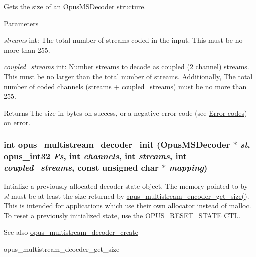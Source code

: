 Gets the size of an {\ttfamily OpusMSDecoder} structure. 
\begin{DoxyParams}{Parameters}
\item[{\em streams}]{\ttfamily int}: The total number of streams coded in the input. This must be no more than 255. \item[{\em coupled\_\-streams}]{\ttfamily int}: Number streams to decode as coupled (2 channel) streams. This must be no larger than the total number of streams. Additionally, The total number of coded channels ({\ttfamily streams + coupled\_\-streams}) must be no more than 255. \end{DoxyParams}
\begin{DoxyReturn}{Returns}
The size in bytes on success, or a negative error code (see \hyperlink{group__opus__errorcodes}{Error codes}) on error. 
\end{DoxyReturn}
\hypertarget{group__opus__multistream_ga09a4d14fc497d4f6fbe76bd1c5d45436}{
\subsubsection[{opus\_\-multistream\_\-decoder\_\-init}]{\setlength{\rightskip}{0pt plus 5cm}int opus\_\-multistream\_\-decoder\_\-init ({\bf OpusMSDecoder} $\ast$ {\em st}, \/  {\bf opus\_\-int32} {\em Fs}, \/  int {\em channels}, \/  int {\em streams}, \/  int {\em coupled\_\-streams}, \/  const unsigned char $\ast$ {\em mapping})}}
\label{group__opus__multistream_ga09a4d14fc497d4f6fbe76bd1c5d45436}


Intialize a previously allocated decoder state object. The memory pointed to by {\itshape st\/} must be at least the size returned by \hyperlink{group__opus__multistream_ga8642aa9cf16115229a655574d832293b}{opus\_\-multistream\_\-encoder\_\-get\_\-size()}. This is intended for applications which use their own allocator instead of malloc. To reset a previously initialized state, use the \hyperlink{group__opus__genericctls_gadc74e4fa8bcdf9994187d52d92207337}{OPUS\_\-RESET\_\-STATE} CTL. \begin{DoxySeeAlso}{See also}
\hyperlink{group__opus__multistream_ga3c0e342774174c471e61cedba53755c9}{opus\_\-multistream\_\-decoder\_\-create} 

opus\_\-multistream\_\-deocder\_\-get\_\-size 
\end{DoxySeeAlso}


